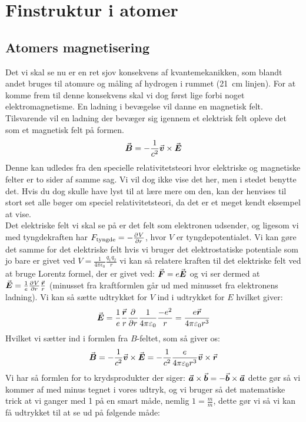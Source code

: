 \documentclass[../../Atom-ogMolekylefysik.tex]{subfiles}
\begin{document}
\section{Finstruktur i atomer}
\subsection{Atomers magnetisering}
Det vi skal se nu er en ret sjov konsekvens af kvantemekanikken, som blandt andet bruges til atomure og måling af hydrogen i rummet (\SI{21}{cm} linjen). For at komme frem til denne konsekvens skal vi dog først lige forbi noget elektromagnetisme. En ladning i bevægelse vil danne en magnetisk felt. Tilsvarende vil en ladning der bevæger sig igennem et elektrisk felt opleve det som et magnetisk felt på formen.
\begin{equation}
    \v{B}=-\frac{1}{c^2}\v{v}\times\v{E}
\end{equation}
Denne kan udledes fra den specielle relativitetsteori hvor elektriske og magnetiske felter er to sider af samme sag. Vi vil dog ikke vise det her, men i stedet benytte det. Hvis du dog skulle have lyst til at lære mere om den, kan der henvises til stort set alle bøger om speciel relativitetsteori, da det er et meget kendt eksempel at vise.\\
Det elektriske felt vi skal se på er det felt som elektronen udsender, og ligesom vi med tyngdekraften har $F_\text{tyngde}=-\pdif{r}{V}$, hvor $V$ er tyngdepotentialet. Vi kan gøre det samme for det elektriske felt hvis vi bruger det elektrostatiske potentiale som jo bare er givet ved $V=\frac{1}{4\pi\epsilon_0}\frac{q_1q_2}{r}$ vi kan så relatere kraften til det elektriske felt ved at bruge Lorentz formel, der er givet ved: $\v F=e\v E$ og vi ser dermed at $\v E=\frac{1}{e}\pdif{r}{V}\frac{\v{r}}{r}$ (minusset fra kraftformlen går ud med minusset fra elektronens ladning). Vi kan så sætte udtrykket for $V$ ind i udtrykket for $E$ hvilket giver:
\begin{equation}
    \v{E}=\frac{1}{e}\frac{\v{r}}{r}\pdif{r}{}\frac{1}{4\pi\epsilon_0}\frac{-e^2}{r}=\frac{e\v{r}}{4\pi\epsilon_0r^3}
\end{equation}
Hvilket vi sætter ind i formlen fra $B$-feltet, som så giver os:
\begin{equation}
    \v{B}=-\frac{1}{c^2}\v{v}\times\v{E}=-\frac{1}{c^2}\frac{e}{4\pi\epsilon_0r^3}\v{v}\times\v{r}
\end{equation}
Vi har så formlen for to krydsprodukter der siger: $\v{a}\times\v{b}=-\v{b}\times\v{a}$
dette gør så vi kommer af med minus tegnet i vores udtryk, og vi bruger så det matematiske trick at vi ganger med 1 på en smart måde, nemlig $1=\frac{m}{m}$, dette gør vi så vi kan få udtrykket til at se ud på følgende måde:
\end{document}
